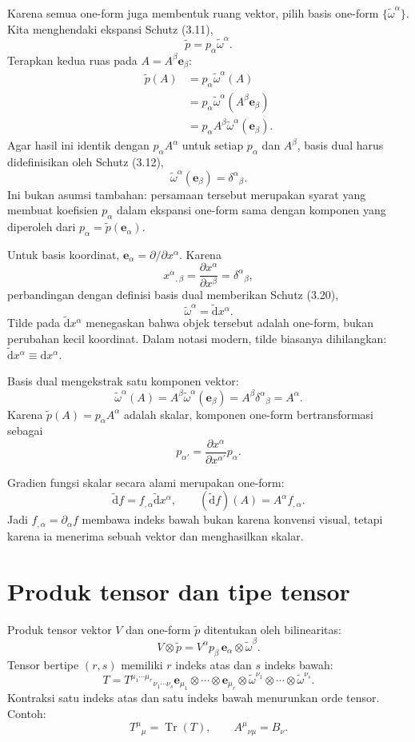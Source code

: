 \documentclass[12pt,a4paper]{report}
\newcommand{\dd}{\mathrm{d}}
\newcommand{\pd}{\partial}
\newcommand{\e}{\mathbf{e}}
\newcommand{\dual}{\widetilde{\omega}}
\newcommand{\oneformp}{\widetilde{p}}
\newcommand{\ddtilde}{\widetilde{\mathrm d}}
\newcommand{\Tr}{\operatorname{Tr}}
\begin{document}
Karena semua one-form juga membentuk ruang vektor, pilih basis one-form
$\{\dual^\alpha\}$. Kita menghendaki ekspansi Schutz (3.11),
\[
 \oneformp=p_\alpha\dual^\alpha.
\]
Terapkan kedua ruas pada $A=A^\beta\e_\beta$:
\begin{align}
 \oneformp(A)
 &=p_\alpha\dual^\alpha(A)\\
 &=p_\alpha\dual^\alpha(A^\beta\e_\beta)\\
 &=p_\alpha A^\beta\dual^\alpha(\e_\beta).
\end{align}
Agar hasil ini identik dengan $p_\alpha A^\alpha$ untuk setiap $p_\alpha$ dan
$A^\beta$, basis dual harus didefinisikan oleh Schutz (3.12),
\[
 \boxed{\dual^\alpha(\e_\beta)=\delta^\alpha{}_\beta.}
\]
Ini bukan asumsi tambahan: persamaan tersebut merupakan syarat yang membuat
koefisien $p_\alpha$ dalam ekspansi one-form sama dengan komponen yang diperoleh
dari $p_\alpha=\oneformp(\e_\alpha)$.

Untuk basis koordinat, $\e_\alpha=\pd/\pd x^\alpha$. Karena
\[
 x^\alpha{}_{,\beta}
 =\frac{\pd x^\alpha}{\pd x^\beta}
 =\delta^\alpha{}_\beta,
\]
perbandingan dengan definisi basis dual memberikan Schutz (3.20),
\[
 \boxed{\dual^\alpha=\ddtilde x^\alpha.}
\]
Tilde pada $\ddtilde x^\alpha$ menegaskan bahwa objek tersebut adalah one-form,
bukan perubahan kecil koordinat. Dalam notasi modern, tilde biasanya dihilangkan:
$\ddtilde x^\alpha\equiv\dd x^\alpha$.

Basis dual mengekstrak satu komponen vektor:
\[
 \dual^\alpha(A)
 =A^\beta\dual^\alpha(\e_\beta)
 =A^\beta\delta^\alpha{}_\beta
 =A^\alpha.
\]
Karena $\oneformp(A)=p_\alpha A^\alpha$ adalah skalar, komponen one-form
bertransformasi sebagai
\[
 p_{\alpha'}=\frac{\pd x^\alpha}{\pd x^{\alpha'}}p_\alpha.
\]

Gradien fungsi skalar secara alami merupakan one-form:
\[
 \ddtilde f=f_{,\alpha}\ddtilde x^\alpha,
 \qquad (\ddtilde f)(A)=A^\alpha f_{,\alpha}.
\]
Jadi $f_{,\alpha}=\pd_\alpha f$ membawa indeks bawah bukan karena konvensi visual, tetapi karena
ia menerima sebuah vektor dan menghasilkan skalar.

\section{Produk tensor dan tipe tensor}

Produk tensor vektor $V$ dan one-form $\oneformp$ ditentukan oleh bilinearitas:
\[
 V\otimes\oneformp
 =V^\alpha p_\beta\,\e_\alpha\otimes\dual^\beta.
\]
Tensor bertipe $(r,s)$ memiliki $r$ indeks atas dan $s$ indeks bawah:
\[
 T=T^{\mu_1\cdots\mu_r}{}_{\nu_1\cdots\nu_s}
 \e_{\mu_1}\otimes\cdots\otimes\e_{\mu_r}
 \otimes\dual^{\nu_1}\otimes\cdots\otimes\dual^{\nu_s}.
\]
Kontraksi satu indeks atas dan satu indeks bawah menurunkan orde tensor. Contoh:
\[
 T^\mu{}_\mu=\Tr(T),
 \qquad A^\mu{}_{\nu\mu}=B_\nu.
\]
\end{document}
